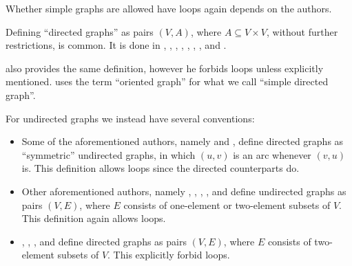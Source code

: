 \begin{remark}\label{rem:simple_graphs}
  Whether simple graphs are allowed have loops again depends on the authors.

  Defining \enquote{directed graphs} as pairs \( (V, A) \), where \( A \subseteq V \times V \), without further restrictions, is common. It is done in
  \cite[10]{Harary1969GraphTheory},
  \cite[def. 1.1.2]{Knauer2019AlgebraicGraphTheory},
  \cite[21]{GondranMinoux1984GraphsAndAlgorithms},
  \cite[571]{Stanley2012EnumerativeCombinatoricsVol1},
  \cite[def. 10.1.2]{Rosen2019DiscreteMathematics},
  \cite[190]{Erickson2019Algorithms},
  \cite[279]{ЕмеличевИПр1990ТеорияГрафов},
  \cite[277]{БелоусовТкачёв2004ДискретнаяМатематика} and
  \cite[6]{Мирчев2001Графи}.

  \Textcite[\S 7.1.5]{Новиков2013ДискретнаяМатематика} also provides the same definition, however he forbids loops unless explicitly mentioned. \Textcite[28]{Diestel2017GraphTheory} uses the term \enquote{oriented graph} for what we call \enquote{simple directed graph}.

  For undirected graphs we instead have several conventions:
  \begin{itemize}
    \item Some of the aforementioned authors, namely \textcite[21]{GondranMinoux1984GraphsAndAlgorithms} and \textcite[277]{БелоусовТкачёв2004ДискретнаяМатематика}, define directed graphs as \enquote{symmetric} undirected graphs, in which \( (u, v) \) is an arc whenever \( (v, u) \) is. This definition allows loops since the directed counterparts do.

    \item Other aforementioned authors, namely \textcite[def. 1.1.2]{Knauer2019AlgebraicGraphTheory}, \textcite[571]{Stanley2012EnumerativeCombinatoricsVol1}, \textcite[def. 10.1.1]{Rosen2019DiscreteMathematics}, \textcite[190]{Erickson2019Algorithms}, and \textcite[7]{Мирчев2001Графи} define undirected graphs as pairs \( (V, E) \), where \( E \) consists of one-element or two-element subsets of \( V \). This definition again allows loops.

    \item \Textcite[9]{Harary1969GraphTheory}, \textcite[2]{Diestel2017GraphTheory}, \textcite[1]{Bollobás1998ModernGraphTheory}, \textcite[9]{ЕмеличевИПр1990ТеорияГрафов} and \textcite[\S 7.1.2]{Новиков2013ДискретнаяМатематика} define directed graphs as pairs \( (V, E) \), where \( E \) consists of two-element subsets of \( V \). This explicitly forbid loops.


\end{itemize}
\end{remark}
